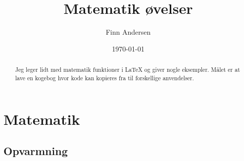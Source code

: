 \documentclass{article}
\begin{document}
\title{Matematik øvelser}

\author{Finn Andersen}
\date{\today}
\maketitle

\begin{abstract}
Jeg leger lidt med matematik funktioner i \LaTeX{} og giver nogle eksempler. Målet er at lave en kogebog hvor kode kan kopieres fra til forskellige anvendelser.
\end{abstract}

\section{Matematik}

\subsection{Opvarmning}
\end{document}
